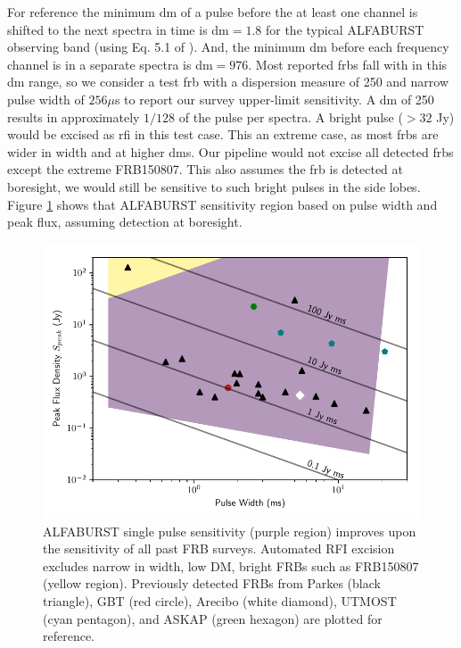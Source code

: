 \documentclass[a4paper,fleqn,usenatbib]{mnras}
\begin{document}
For reference the minimum \gls{dm} of a pulse before the at least one channel is
shifted to the next spectra in time is \gls{dm}$=1.8$ for the typical ALFABURST
observing band (using Eq. 5.1 of \cite{2004hpa..book.....L}). And, the minimum
\gls{dm} before each frequency channel is in a separate spectra is
\gls{dm}$=976$. Most reported \glspl{frb} fall with in this \gls{dm} range, so
we consider a test \gls{frb} with a dispersion measure of 250 and narrow
pulse width of $256 \mu$s to report our survey upper-limit sensitivity. A
\gls{dm} of 250 results in approximately $1/128$ of the pulse per spectra. A
bright pulse ($>32$ Jy) would be excised as \gls{rfi} in this test case. This an
extreme case, as most \glspl{frb} are wider in width and at higher \glspl{dm}.
Our pipeline would not excise all detected \glspl{frb} except the extreme
FRB150807.  This also assumes the \gls{frb} is detected at boresight, we would
still be sensitive to such bright pulses in the side lobes. Figure
\ref{fig:fluence_rate} shows that ALFABURST sensitivity region based on pulse
width and peak flux, assuming detection at boresight.

\begin{figure}
    \includegraphics[width=1.0\linewidth]{figures/fluence_rate.pdf}
    \caption{ALFABURST single pulse sensitivity (purple region) improves upon
    the sensitivity of all past FRB surveys. Automated RFI excision excludes
    narrow in width, low DM, bright FRBs such as FRB150807 (yellow region).
    Previously detected FRBs from Parkes (black triangle), GBT (red circle),
    Arecibo (white diamond), UTMOST (cyan pentagon), and ASKAP (green hexagon)
    are plotted for reference.
    }
    \label{fig:fluence_rate}
\end{figure}
\end{document}
